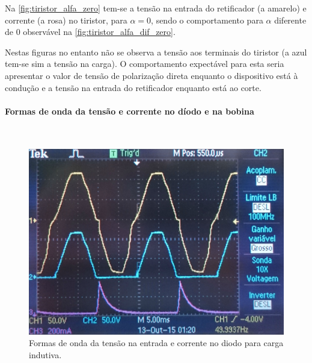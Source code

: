 \documentclass[a4paper,11pt]{article}
\numberwithin{equation}{section}
\begin{document}
Na \autoref{fig:tiristor_alfa_zero} tem-se a tensão na entrada do retificador (a amarelo) e corrente (a rosa) no tiristor, para $\alpha = 0$, sendo o comportamento para $\alpha$ diferente de $0$ observável na \autoref{fig:tiristor_alfa_dif_zero}.

Nestas figuras no entanto não se observa a tensão aos terminais do tiristor (a azul tem-se sim a tensão na carga). O comportamento expectável para esta seria apresentar o valor de tensão de polarização direta enquanto o dispositivo está à condução e a tensão na entrada do retificador enquanto está ao corte.

\pagebreak

\paragraph{Formas de onda da tensão e corrente no díodo e na bobina}\mbox{}\

\begin{figure}[H]
	\centering
	\includegraphics[keepaspectratio=true, scale=0.12]{img/figs/diodo_alfa_zero}
	\caption{Formas de onda da tensão na entrada e corrente no diodo para carga indutiva.}
	\label{fig:diodo_alfa_zero}
	\vspace{-0.8em}
\end{figure}
\end{document}
